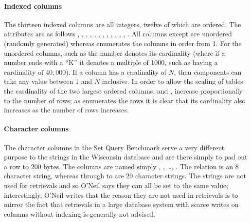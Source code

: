 \paragraph{Indexed columns} The thirteen indexed columns are all integers,
twelve of which are ordered. The attributes are as follows
, ,
, ,
, ,
, ,
, , ,
, . All columns except
 are unordered (randomly generated) whereas
 enumerates the columns in order from 1. For the
unordered columns, such as  the number denotes its
cardinality (where if a number ends with a ``K'' it denotes a multiple of 1000,
such as  having a cardinality of $40,000$). If a column
has a cardinality of $N$, then components can take any value between $1$ and
$N$ inclusive. In order to allow the scaling of tables the cardinality of the
two largest ordered columns,  and
, increase proportionally to the number of rows; as
 enumerates the rows it is clear that its
cardinality also increases as the number of rows increases.

\paragraph{Character columns} The character columns in the Set Query Benchmark
serve a very different purpose to the strings in the Wisconsin database and are
there simply to pad out a row to 200 bytes. The columns are named simply
, , \ldots, .
The relation
 is an 8 character string, whereas  through to
 are 20 character strings. The strings are not used for retrievals
and so O'Neil says they can all be set to the same value; interestingly, O'Neil
writes that the reason they are not used in retrievals is to mirror the fact
that
retrievals in a large database system with scarce writes on columns without
indexing is generally not advised.
